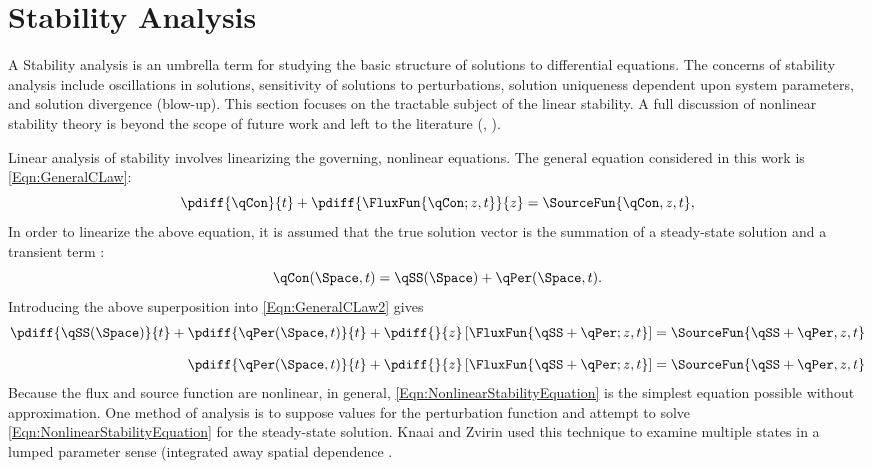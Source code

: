 \section{Stability Analysis}\label{Section:StabilityTheory}A
Stability analysis is an umbrella term for studying the basic structure of solutions to differential equations.
The concerns of stability analysis include oscillations in solutions, sensitivity of solutions to perturbations, solution uniqueness dependent upon system parameters, and solution divergence (blow-up).
This section focuses on the tractable subject of the linear stability.
A full discussion of nonlinear stability theory is beyond the scope of future work and left to the literature (\eg, \cite{guckenheimer_nonlinear_1983,galaktionov_stability_2004}).


Linear analysis of stability involves linearizing the governing, nonlinear equations.
The general equation considered in this work is \cref{Eqn:GeneralCLaw}:
\begin{equation}
    \pdiff{\qCon}{t} + \pdiff{\FluxFun{\qCon; z,t}}{z} = \SourceFun{\qCon,z,t},
\label{Eqn:GeneralCLaw2}
\end{equation}
In order to linearize the above equation, it is assumed that the true solution vector \qCon is the summation of a steady-state solution \qSS and a transient term \qPer:
\begin{equation}
    \qCon(\Space,t) = \qSS(\Space) + \qPer(\Space,t).
\end{equation}
Introducing the above superposition into \cref{Eqn:GeneralCLaw2} gives
\begin{align}
    \pdiff{\qSS(\Space)}{t} + \pdiff{\qPer(\Space,t)}{t}   + \pdiff{}{z} \left[\FluxFun{\qSS + \qPer; z,t}\right] &= \SourceFun{\qSS + \qPer,z,t} \\[0.8em]
                               \pdiff{\qPer(\Space,t)}{t}  + \pdiff{}{z} \left[\FluxFun{\qSS + \qPer; z,t}\right] &= \SourceFun{\qSS + \qPer,z,t} 
                            \label{Eqn:NonlinearStabilityEquation}
\end{align}
Because the flux and source function are nonlinear, in general, \cref{Eqn:NonlinearStabilityEquation} is the simplest equation possible without approximation.
One method of analysis is to suppose values for the perturbation function and attempt to solve \cref{Eqn:NonlinearStabilityEquation} for the steady-state solution.  
Knaai and Zvirin used this technique to examine multiple states in a lumped parameter sense (integrated away spatial dependence \cite{knaani_bifurcation_1993}.

